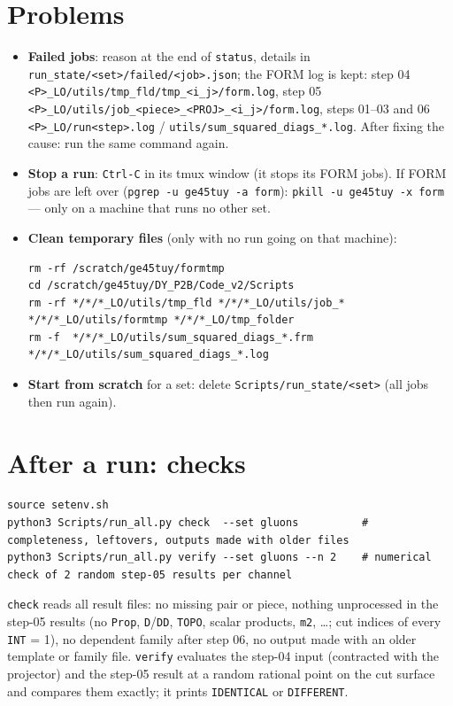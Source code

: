 \documentclass[10pt]{article}
\newcommand{\cmd}[1]{\texttt{#1}}
\begin{document}
\section{Problems}
\begin{itemize}
\item \textbf{Failed jobs}: reason at the end of \cmd{status}, details in \cmd{run\_state/<set>/failed/<job>.json};
  the FORM log is kept: step 04 \cmd{<P>\_LO/utils/tmp\_fld/tmp\_<i\_j>/form.log}, step 05
  \cmd{<P>\_LO/utils/job\_<piece>\_<PROJ>\_<i\_j>/form.log}, steps 01--03 and 06 \cmd{<P>\_LO/run<step>.log} /
  \cmd{utils/sum\_squared\_diags\_*.log}. After fixing the cause: run the same command again.
\item \textbf{Stop a run}: \cmd{Ctrl-C} in its tmux window (it stops its FORM jobs). If FORM jobs are left over
  (\cmd{pgrep -u ge45tuy -a form}): \cmd{pkill -u ge45tuy -x form} --- only on a machine that runs no other set.
\item \textbf{Clean temporary files} (only with no run going on that machine):
\begin{lstlisting}
rm -rf /scratch/ge45tuy/formtmp
cd /scratch/ge45tuy/DY_P2B/Code_v2/Scripts
rm -rf */*/*_LO/utils/tmp_fld */*/*_LO/utils/job_* */*/*_LO/utils/formtmp */*/*_LO/tmp_folder
rm -f  */*/*_LO/utils/sum_squared_diags_*.frm */*/*_LO/utils/sum_squared_diags_*.log
\end{lstlisting}
\item \textbf{Start from scratch} for a set: delete \cmd{Scripts/run\_state/<set>} (all jobs then run again).
\end{itemize}

\section{After a run: checks}
\begin{lstlisting}
source setenv.sh
python3 Scripts/run_all.py check  --set gluons          # completeness, leftovers, outputs made with older files
python3 Scripts/run_all.py verify --set gluons --n 2    # numerical check of 2 random step-05 results per channel
\end{lstlisting}
\cmd{check} reads all result files: no missing pair or piece, nothing unprocessed in the step-05 results (no
\cmd{Prop}, \cmd{D}/\cmd{DD}, \cmd{TOPO}, scalar products, \cmd{m2}, \ldots; cut indices of every \cmd{INT} = 1), no
dependent family after step 06, no output made with an older template or family file.
\cmd{verify} evaluates the step-04 input (contracted with the projector) and the step-05 result at a random rational
point on the cut surface and compares them exactly; it prints \cmd{IDENTICAL} or \cmd{DIFFERENT}.
\end{document}
